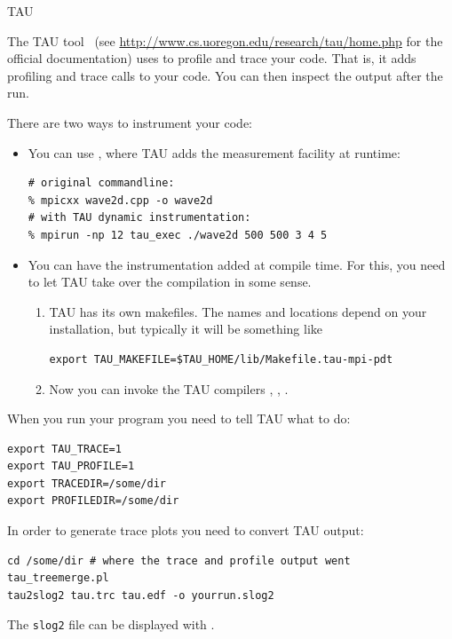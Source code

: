  {TAU}
\label{sec:tau}

The TAU tool~\cite{TAU:ijhpca}
(see \url{http://www.cs.uoregon.edu/research/tau/home.php} for the official documentation)
uses  to profile and trace your code. That is, it adds 
profiling and trace calls to your code. You can then inspect
the output after the run.

There are two ways to instrument your code:
\begin{itemize}
\item You can use , where TAU adds the measurement facility at runtime:
\begin{verbatim}
# original commandline:
% mpicxx wave2d.cpp -o wave2d
# with TAU dynamic instrumentation:
% mpirun -np 12 tau_exec ./wave2d 500 500 3 4 5
\end{verbatim}
\item You can have the instrumentation added at compile time. For
  this, you need to let TAU take over the compilation in some sense.
  \begin{enumerate}
  \item TAU has its own makefiles. The names and locations depend on
    your installation, but typically it will be something like
\begin{verbatim}
export TAU_MAKEFILE=$TAU_HOME/lib/Makefile.tau-mpi-pdt
\end{verbatim}
  \item Now you can invoke the TAU compilers , , .
  \end{enumerate}
\end{itemize}

When you run your program you need to tell TAU what to do:
\begin{verbatim}
export TAU_TRACE=1
export TAU_PROFILE=1
export TRACEDIR=/some/dir
export PROFILEDIR=/some/dir
\end{verbatim}

In order to generate trace plots you need to convert TAU output:
\begin{verbatim}
cd /some/dir # where the trace and profile output went
tau_treemerge.pl
tau2slog2 tau.trc tau.edf -o yourrun.slog2
\end{verbatim}

The \texttt{slog2} file can be displayed with .


